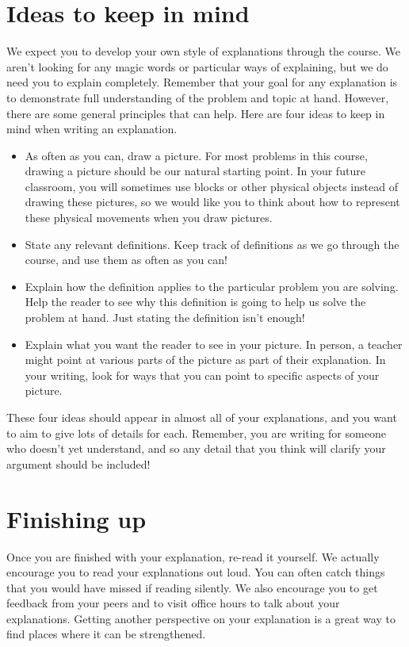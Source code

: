 \documentclass[noauthor,nooutcomes]{ximera}
\begin{document}
\section{Ideas to keep in mind}
We expect you to develop your own style of explanations through the course. We aren't looking for any magic words or particular ways of explaining, but we do need you to explain completely. Remember that your goal for any explanation is to demonstrate full understanding of the problem and topic at hand. However, there are some general principles that can help. Here are four ideas to keep in mind when writing an explanation.
\begin{itemize}
	\item As often as you can, draw a picture. For most problems in this course, drawing a picture should be our natural starting point. In your future classroom, you will sometimes use blocks or other physical objects instead of drawing these pictures, so we would like you to think about how to represent these physical movements when you draw pictures.
	\item State any relevant definitions. Keep track of definitions as we go through the course, and use them as often as you can!
	\item Explain how the definition applies to the particular problem you are solving. Help the reader to see why this definition is going to help us solve the problem at hand. Just stating the definition isn't enough!
	\item Explain what you want the reader to see in your picture. In person, a teacher might point at various parts of the picture as part of their explanation. In your writing, look for ways that you can point to specific aspects of your picture.
\end{itemize}
These four ideas should appear in almost all of your explanations, and you want to aim to give lots of details for each. Remember, you are writing for someone who doesn't yet understand, and so any detail that you think will clarify your argument should be included!

\section{Finishing up}
Once you are finished with your explanation, re-read it yourself. We actually encourage you to read your explanations out loud. You can often catch things that you would have missed if reading silently. We also encourage you to get feedback from your peers and to visit office hours to talk about your explanations. Getting another perspective on your explanation is a great way to find places where it can be strengthened.
\end{document}
